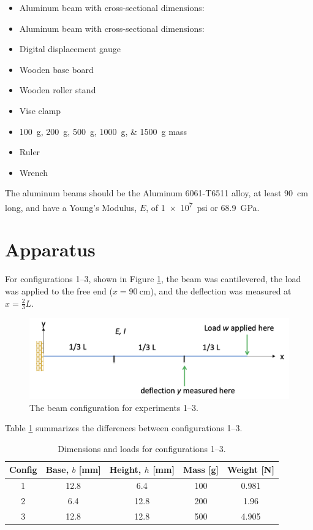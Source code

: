\documentclass[12 pt]{article}
\begin{document}
\begin{itemize}
	\item Aluminum beam with cross-sectional dimensions: 
	\item Aluminum beam with cross-sectional dimensions: 
	\item Digital displacement gauge
	\item Wooden base board
	\item Wooden roller stand
	\item Vise clamp
	\item \qtylist{100;200;500;1000;1500}{\g} mass
	\item Ruler
	\item Wrench
\end{itemize}

The aluminum beams should be the Aluminum 6061-T6511 alloy, at least \qty{90}{\cm} long, and have a Young's Modulus, $E$, of \qty{1e7}{psi} or \qty{68.9}{\GPa}.

\section{Apparatus} \label{apparatus}
For configurations 1--3, shown in Figure \ref{fig:config_1-3}, the beam was cantilevered, the load was applied to the free end ($x=\qty{90}{\cm}$), and the deflection was measured at $x=\frac{2}{3}L$.

\begin{figure}[htbp]
\centering
\includegraphics[width=6in]{images/Config 1-3}
\caption{The beam configuration for experiments 1--3.}
\label{fig:config_1-3}
\end{figure}

Table \ref{tbl:configs} summarizes the differences between configurations 1--3.

\begin{table}[!htbp]
\caption{Dimensions and loads for configurations 1--3.}
\begin{center}
	\begin{tabular}{|c|c|c|c|c|}
		\hline
		Config&Base, $b$ [\unit{\mm}]&Height, $h$ [\unit{\mm}]&Mass [\unit{\g}]&Weight [\unit{\N}]\\
		\hline
		\num{1}&\num{12.8}&\num{6.4}&\num{100}&\num{0.981}\\
		\hline
		\num{2}&\num{6.4}&\num{12.8}&\num{200}&\num{1.96}\\
		\hline
		\num{3}&\num{12.8}&\num{12.8}&\num{500}&\num{4.905}\\
		\hline
	\end{tabular}
\end{center}
\label{tbl:configs}
\end{table}
\end{document}

